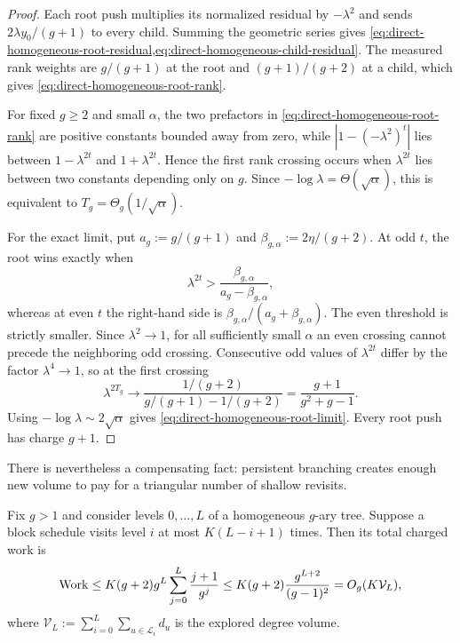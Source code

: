 \begin{proof}
Each root push multiplies its normalized residual by $-\lambda^2$ and sends
$2\lambda y_0/(g+1)$ to every child.  Summing the geometric series gives
\cref{eq:direct-homogeneous-root-residual,eq:direct-homogeneous-child-residual}.
The measured rank weights are $g/(g+1)$ at the root and
$(g+1)/(g+2)$ at a child, which gives
\cref{eq:direct-homogeneous-root-rank}.

For fixed $g\geq2$ and small $\alpha$, the two prefactors in
\cref{eq:direct-homogeneous-root-rank} are positive constants bounded away
from zero, while
$|1-(-\lambda^2)^t|$ lies between $1-\lambda^{2t}$ and
$1+\lambda^{2t}$.  Hence the first rank crossing occurs when
$\lambda^{2t}$ lies between two constants depending only on $g$.  Since
$-\log\lambda=\Theta(\sqrt\alpha)$, this is equivalent to
$T_g=\Theta_g(1/\sqrt\alpha)$.

For the exact limit, put
$a_g:=g/(g+1)$ and $\beta_{g,\alpha}:=2\eta/(g+2)$.  At odd $t$, the root wins
exactly when
\begin{equation*}
 \lambda^{2t}>\frac{\beta_{g,\alpha}}
 {a_g-\beta_{g,\alpha}},
\end{equation*}
whereas at even $t$ the right-hand side is
$\beta_{g,\alpha}/(a_g+\beta_{g,\alpha})$.  The even threshold is strictly smaller.  Since
$\lambda^2\to1$, for all sufficiently small $\alpha$ an even crossing cannot
precede the neighboring odd crossing.  Consecutive odd values of
$\lambda^{2t}$ differ by the factor $\lambda^4\to1$, so at the first crossing
\begin{equation*}
 \lambda^{2T_g}\longrightarrow
 \frac{1/(g+2)}{g/(g+1)-1/(g+2)}
 =\frac{g+1}{g^2+g-1}.
\end{equation*}
Using $-\log\lambda\sim2\sqrt\alpha$ gives
\cref{eq:direct-homogeneous-root-limit}.  Every root push has charge $g+1$.
\end{proof}

There is nevertheless a compensating fact: persistent branching creates
enough new volume to pay for a triangular number of shallow revisits.

\begin{lemma}
\label{lem:direct-expansion-credit}
Fix $g>1$ and consider levels $0,\ldots,L$ of a homogeneous $g$-ary tree.
Suppose a block schedule visits level $i$ at most $K(L-i+1)$ times.  Then its
total charged work is
\begin{equation}
 \operatorname{Work}
 \leq K(g+2)g^L\sum_{j=0}^{L}\frac{j+1}{g^j}
 \leq K(g+2)\frac{g^{L+2}}{(g-1)^2}
 =O_g(K\mathcal V_L),
 \label{eq:direct-expansion-credit}
\end{equation}
where
$\mathcal V_L:=\sum_{i=0}^{L}\sum_{u\in\mathcal L_i}d_u$
is the explored degree volume.
\end{lemma}

